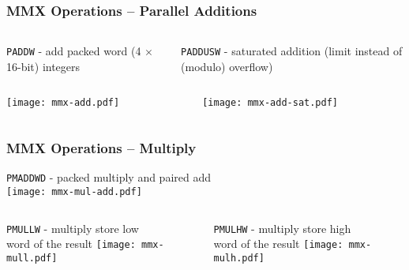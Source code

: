 \documentclass{beamer}
\begin{document}
\begin{frame}
\frametitle{MMX Operations -- Parallel Additions}
\begin{columns}[t,onlytextwidth]
  \begin{column}{0.5\textwidth}
    \texttt{PADDW} - add packed word (4 $\times$ 16-bit) integers
  \end{column}
  \begin{column}{0.5\textwidth}
    \texttt{PADDUSW} - saturated addition (limit instead of (modulo) overflow)
  \end{column}
\end{columns}
\begin{columns}[t,onlytextwidth]
  \begin{column}{0.5\textwidth}
    \begin{center}
    \texttt{[image: mmx-add.pdf]}
    \end{center}
  \end{column}
  \begin{column}{0.5\textwidth}
    \begin{center}
    \texttt{[image: mmx-add-sat.pdf]}
    \end{center}
  \end{column}
\end{columns}

\end{frame}

\begin{frame}
\frametitle{MMX Operations -- Multiply}
\small
    \begin{center}
    \texttt{PMADDWD} - packed multiply and paired add\\
    \texttt{[image: mmx-mul-add.pdf]}
    \end{center}
\vspace{-1cm}
\begin{columns}[t,onlytextwidth]
  \begin{column}{0.5\textwidth}
    \begin{center}
    \texttt{PMULLW} - multiply store low\\ word of the result
    \texttt{[image: mmx-mull.pdf]}
    \end{center}
  \end{column}
  \begin{column}{0.5\textwidth}
    \begin{center}
    \texttt{PMULHW} - multiply store high\\ word of the result
    \texttt{[image: mmx-mulh.pdf]}
    \end{center}
  \end{column}
\end{columns}


\end{frame}
\end{document}
